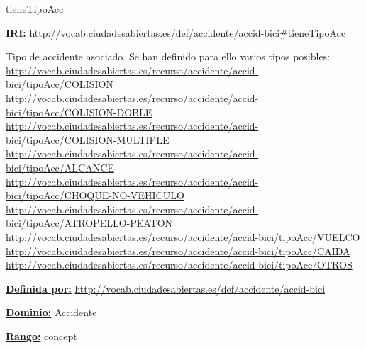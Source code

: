 \begin{mybox}{tieneTipoAcc}
\begin{flushleft}
\underline{\textbf{IRI:}}
\url{http://vocab.ciudadesabiertas.es/def/accidente/accid-bici#tieneTipoAcc}
\newline

Tipo de accidente asociado. Se han definido para ello varios tipos posibles:
\newline \url{http://vocab.ciudadesabiertas.es/recurso/accidente/accid-bici/tipoAcc/COLISION}
\newline \url{http://vocab.ciudadesabiertas.es/recurso/accidente/accid-bici/tipoAcc/COLISION-DOBLE}
\newline \url{http://vocab.ciudadesabiertas.es/recurso/accidente/accid-bici/tipoAcc/COLISION-MULTIPLE}
\newline \url{http://vocab.ciudadesabiertas.es/recurso/accidente/accid-bici/tipoAcc/ALCANCE}
\newline \url{http://vocab.ciudadesabiertas.es/recurso/accidente/accid-bici/tipoAcc/CHOQUE-NO-VEHICULO}
\newline \url{http://vocab.ciudadesabiertas.es/recurso/accidente/accid-bici/tipoAcc/ATROPELLO-PEATON}
\newline \url{http://vocab.ciudadesabiertas.es/recurso/accidente/accid-bici/tipoAcc/VUELCO}
\newline \url{http://vocab.ciudadesabiertas.es/recurso/accidente/accid-bici/tipoAcc/CAIDA}
\newline \url{http://vocab.ciudadesabiertas.es/recurso/accidente/accid-bici/tipoAcc/OTROS}
\newline

\underline{\textbf{Definida por:}}
\newline \url{http://vocab.ciudadesabiertas.es/def/accidente/accid-bici}
\newline

\underline{\textbf{Dominio:}} 
\newline Accidente
\newline

\underline{\textbf{Rango:}} 
\newline concept
\newline

\end{flushleft}
\end{mybox}




